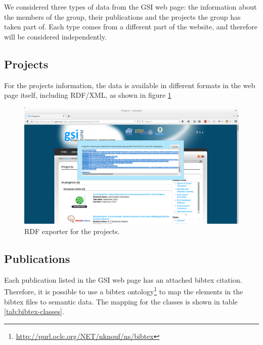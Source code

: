 We considered three types of data from the GSI web page: the information about the members of the group, their publications and the projects the group has taken part of. Each type comes from a different part of the website, and therefore will be considered independently. 

\subsection{Projects}

For the projects information, the data is available in different formats in the web page itself, including RDF/XML, as shown in figure \ref{fig:gsiprojects}

\begin{figure}[!htbp]
    \centering
    \includegraphics[width=\textwidth]{img/screens/gsi-projects.png}
    \caption{\ac{RDF} exporter for the projects.}
    \label{fig:gsiprojects}
\end{figure}


\subsection{Publications}
\label{subsec:bibtexrdf}

Each publication listed in the GSI web page has an attached bibtex citation. Therefore, it is possible to use a bibtex ontology\footnote{\url{http://purl.oclc.org/NET/nknouf/ns/bibtex}} to map the elements in the bibtex files to semantic data. The mapping for the classes is shown in table \ref{tab:bibtex-classes}.

